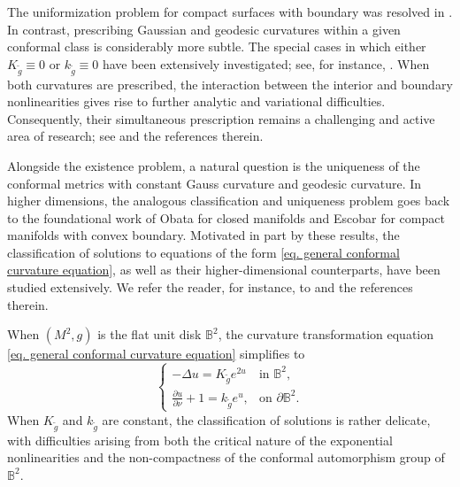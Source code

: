 \documentclass[11pt,a4paper,twoside]{amsart}
\newtheorem{sketch proof}{Sketch of the proof}[section]
\begin{document}
The uniformization problem for compact surfaces with boundary was resolved in \cite{Osgood88,Bre02,Bre02Family}. In contrast, prescribing Gaussian and geodesic curvatures within a given conformal class is considerably more subtle.  The special cases in which either $K_{\tilde g}\equiv 0$ or $k_{\tilde g}\equiv 0$ have been extensively investigated; see, for instance, \cite{CY87,LL93,CSV25,CV19,CL96}.
When both curvatures are prescribed, the interaction between the interior and boundary nonlinearities gives rise to further analytic and variational difficulties. Consequently, their simultaneous prescription remains a challenging and active area of research; see \cite{CBR18,Rui24,LMR22,BLS25,LRR26} and the references therein.


Alongside the existence problem, a natural question is the uniqueness of the conformal metrics with constant Gauss curvature and geodesic curvature.
In higher dimensions, the analogous classification and uniqueness problem goes back to the foundational work of Obata \cite{Oba71} for closed manifolds and Escobar \cite{Esc88} for compact manifolds with convex boundary.
Motivated in part by these results, the classification  of solutions to equations of the form \cref{eq. general conformal curvature equation}, as well as their higher-dimensional counterparts, have been studied extensively. We refer the reader, for instance, to \cite{Osgood88,Esc90,HW06,Jim12,Wang2017,GHW21,GL25,Dou-Xu,Cai26} and the references therein.

When $(M^2,g)$ is the flat unit disk $\mathbb{B}^2$, the curvature transformation equation \cref{eq. general conformal curvature equation} simplifies to
\[
\begin{cases}
    -\Delta u=K_{\tilde{g}}e^{2u}
    &\text{in }\mathbb{B}^2,\\[2mm]
    \displaystyle{\frac{\partial u}{\partial\nu}
    +1=k_{\tilde{g}}e^u},
    &\text{on }\partial \mathbb{B}^2.
\end{cases}
\]
When $K_{\tilde g}$ and $k_{\tilde g}$ are constant, the classification of solutions is rather delicate, with difficulties arising from both the critical nature of the exponential nonlinearities and the non-compactness of the conformal automorphism group of $\mathbb{B}^2$.
\end{document}
